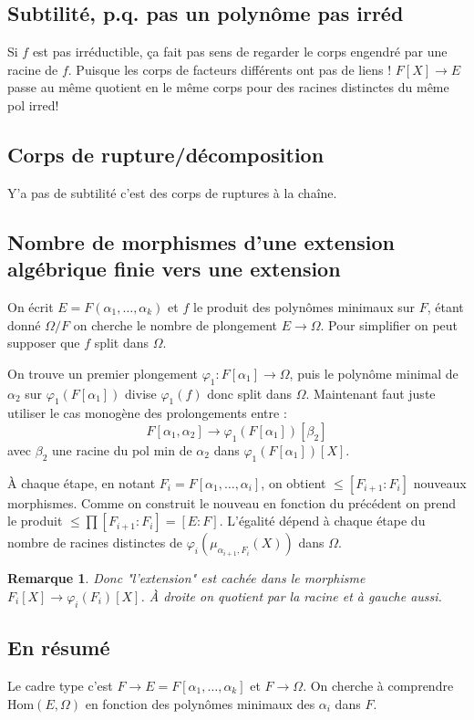 \documentclass[a4paper,12pt]{book}
\newcommand{\Hom}{\textrm{Hom}}
\theoremstyle{plain}
\newtheorem{rem}{Remarque}
\theoremstyle{definition}
\theoremstyle{remark}
\begin{document}
\subsection{Subtilité, p.q. pas un polynôme pas irréd}
Si $f$ est pas irréductible, ça fait pas sens de regarder le
corps engendré par une racine de $f$. Puisque les corps de facteurs
différents ont pas de liens ! $F[X]\to E$ passe au même quotient
en le même corps pour des racines distinctes du même pol irred!

\subsection{Corps de rupture/décomposition}
Y'a pas de subtilité c'est des corps de ruptures à la chaîne.

\subsection{Nombre de morphismes d'une extension algébrique finie
vers une extension}
On écrit $E=F(\alpha_1,\ldots,\alpha_k)$ et $f$ le produit des
polynômes minimaux sur $F$, étant donné $\Omega/F$ on cherche 
le nombre de plongement $E\to \Omega$. Pour simplifier on peut
supposer que $f$ split dans $\Omega$.

On trouve un premier plongement 
$\varphi_1\colon F[\alpha_1]\to \Omega$, puis le polynôme minimal
de $\alpha_2$ sur $\varphi_1(F[\alpha_1])$ divise $\varphi_1(f)$
donc split dans $\Omega$. Maintenant faut juste utiliser 
le cas monogène des prolongements entre :
\[F[\alpha_1,\alpha_2]\to\varphi_1(F[\alpha_1])[\beta_2]\]
avec $\beta_2$ une racine du pol min de $\alpha_2$ dans
$\varphi_1(F[\alpha_1])[X]$. 

À chaque étape, en notant $F_i=F[\alpha_1,\ldots,\alpha_i]$, on
obtient $\leq [F_{i+1}:F_i]$ nouveaux morphismes. Comme on 
construit le nouveau en fonction du précédent on prend le 
produit $\leq \prod [F_{i+1}:F_i]=[E:F]$. L'égalité dépend à
chaque étape du nombre de racines distinctes de
$\varphi_i(\mu_{\alpha_{i+1},F_i}(X))$ dans $\Omega$.


\begin{rem}
  Donc "l'extension" est cachée dans le morphisme $F_i[X]\to
  \varphi_i(F_i)[X]$. À droite on quotient par la racine et
  à gauche aussi.
\end{rem}
\subsection{En résumé}
Le cadre type c'est $F\to E=F[\alpha_1,\ldots,\alpha_k]$ et 
$F\to \Omega$. On cherche à comprendre $\Hom(E,\Omega)$ en fonction
des polynômes minimaux des $\alpha_i$ dans $F$.
\end{document}
